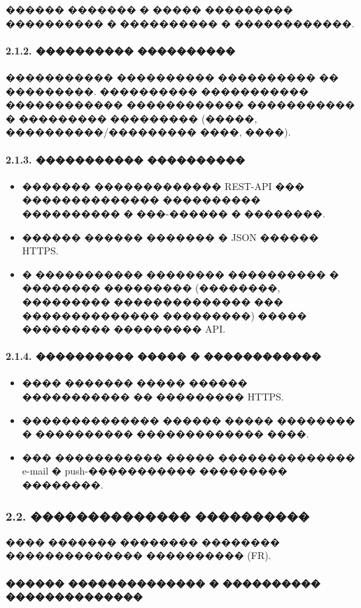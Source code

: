 \documentclass{G7-32}
\begin{document}
������ ������� � ����� ��������� ���������� � ���������� � ������������.

\paragraph{2.1.2. ���������� ����������}

����������� ���������� ���������� �� ���������. ���������� ����������� ������������ ������������ ����������� � ��������� ��������� (�����, ����������/��������� ����, ����).

\paragraph{2.1.3. ����������� ����������}

\begin{itemize}
  \item ������� ������������� REST-API ��� �������������� ���������� ���������� � ���-������ � ��������.
  \item ������ ������ ������� � JSON ������ HTTPS.
  \item � ����������� �������� ���������� � �������� ��������� (��������, ��������� �������������� ��� �������������� ���������) ����� ��������� ��������� API.
\end{itemize}

\paragraph{2.1.4. ���������� ����� � ������������}

\begin{itemize}
  \item ���� ������� ����� ������ ����������� �� ��������� HTTPS.
  \item �������������� ������ ����� �������� � ���������� ������������� ����.
  \item ��� ����������� ����� �������������� e-mail � push-����������� ��������� ��������.
\end{itemize}

\subsubsection*{2.2. �������������� ����������}

���� ������� �������� �������� �������������� ���������� (FR).

\paragraph{������ �������������� � ���������� ��������������}
\end{document}
